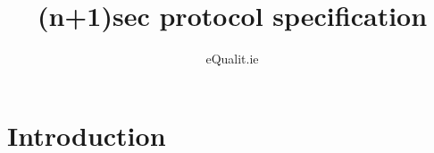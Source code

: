 \documentclass{article}
\title{(n+1)sec protocol specification}
\author{eQualit.ie}
\begin{document}
\maketitle

\section{Introduction}
\label{sec:introduction}

\begin{comment}
== introduction ==



== chat model ==
what np1sec does
how np1sec works from an API / UI point of view



== protocol overview ==

=== rooms and conversations ===
messages addressed to conversations described here?

=== cryptography ===
// what is the right location for this subsection?

=== conversation state machine ===

=== joining a conversation ===

=== events ===

=== sessions and key exchanges ===



== the conversation state machine ==

=== introduction to the state machine model ===
why do we use a state machine model?
upsides and downsides

=== participants ===

=== state machine hash ===
NOT: the details of how this hash is computed

=== events ===

=== key exchanges ===
including: latest session id



== messages ==
the big list. describes, in a css-style declarative format, what effects each message is supposed to have on the conversation state machine.



== events ==
full list of events. Individual events are introduced in the messages section; this section has an overview, and details of what's in each event.



== crypto details ==



== packet format ==


\end{comment}
\end{document}
